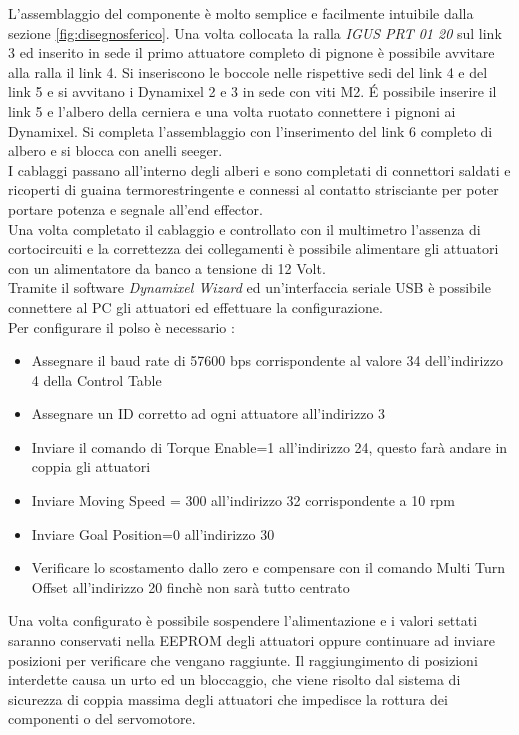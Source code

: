 \documentclass[%
corpo=11pt,
twoside,
 stile=classica,
oldstyle,
greek,%
]{toptesi}
\begin{document}
	L'assemblaggio del componente è molto semplice e facilmente intuibile dalla sezione \ref{fig:disegnosferico}. Una volta collocata la ralla \textit{IGUS PRT 01 20} sul link 3 ed inserito in sede il primo attuatore completo di pignone è possibile avvitare alla ralla il link 4. Si inseriscono le boccole nelle rispettive sedi del link 4 e del link 5 e si avvitano i Dynamixel 2 e 3 in sede con viti M2. \'E possibile inserire il link 5 e l'albero della cerniera e una volta ruotato connettere i pignoni ai Dynamixel. Si completa l'assemblaggio con l'inserimento del link 6 completo di albero e si blocca con anelli seeger.\\
	I cablaggi passano all'interno degli alberi e sono completati di connettori saldati e ricoperti di guaina termorestringente e connessi al contatto strisciante per poter portare potenza e segnale all'end effector. \\
	Una volta completato il cablaggio e controllato con il multimetro l'assenza di cortocircuiti e la correttezza dei collegamenti è possibile alimentare gli attuatori con un alimentatore da banco a tensione di 12 Volt. \\
		Tramite il software \textit{Dynamixel Wizard} ed un'interfaccia seriale USB è possibile connettere al PC gli attuatori ed effettuare la configurazione. \\
	Per configurare il polso è necessario :
	\begin{itemize}
		\item Assegnare il baud rate di 57600 bps corrispondente  al valore 34 dell'indirizzo 4 della Control Table
		\item Assegnare un ID corretto ad ogni attuatore all'indirizzo 3
		\item Inviare il comando di Torque Enable=1 all'indirizzo 24, questo farà andare in coppia gli attuatori
		\item Inviare Moving Speed = 300 all'indirizzo 32 corrispondente a 10 rpm 
		\item Inviare  Goal Position=0 all'indirizzo 30
		\item Verificare lo scostamento dallo zero e compensare con il comando Multi Turn Offset all'indirizzo 20 finchè non sarà tutto centrato
		
	\end{itemize}
	Una volta configurato è possibile sospendere l'alimentazione e i valori settati saranno conservati nella EEPROM degli attuatori oppure continuare ad inviare posizioni per verificare che vengano raggiunte. 
	Il raggiungimento di posizioni interdette causa un urto ed un bloccaggio, che viene risolto dal sistema di sicurezza di coppia massima degli attuatori che impedisce la rottura dei componenti o del servomotore. 
\end{document}
